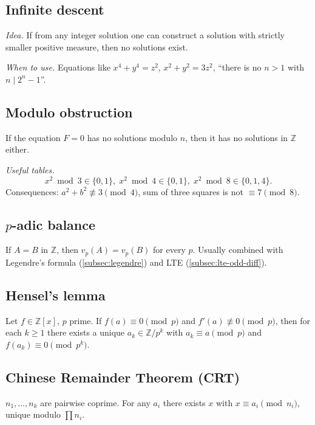 \subsection{Infinite descent}
\label{subsec:descent}

\textit{Idea.} If from any integer solution one can construct a solution with strictly smaller positive measure, then no solutions exist.

\textit{When to use.} Equations like $x^4+y^4=z^2$, $x^2+y^2=3z^2$, ``there is no $n>1$ with $n\mid2^n-1$''.

\subsection{Modulo obstruction}
\label{subsec:mod-obstruction}

If the equation $F=0$ has no solutions modulo $n$, then it has no solutions in $\mathbb{Z}$ either.

\textit{Useful tables.}
$$x^2\bmod3\in\{0,1\},\; x^2\bmod4\in\{0,1\},\; x^2\bmod8\in\{0,1,4\}.$$
Consequences: $a^2+b^2\not\equiv3\pmod4$, sum of three squares is not $\equiv7\pmod8$.

\subsection{$p$-adic balance}
\label{subsec:padic-balance}

If $A=B$ in $\mathbb{Z}$, then $v_p(A)=v_p(B)$ for every $p$. Usually combined with Legendre's formula (\ref{subsec:legendre}) and LTE (\ref{subsec:lte-odd-diff}).

\subsection{Hensel's lemma}
\label{subsec:hensel}

Let $f\in\mathbb{Z}[x]$, $p$ prime. If $f(a)\equiv0\pmod p$ and $f'(a)\not\equiv0\pmod p$, then for each $k\ge1$ there exists a unique $a_k\in\mathbb{Z}/p^k$ with $a_k\equiv a\pmod p$ and $f(a_k)\equiv0\pmod{p^k}$.

\subsection{Chinese Remainder Theorem (CRT)}
\label{subsec:crt}

$n_1,\dots,n_k$ are pairwise coprime. For any $a_i$ there exists $x$ with $x\equiv a_i\pmod{n_i}$, unique modulo $\prod n_i$.


